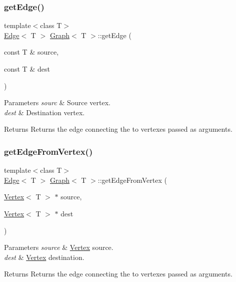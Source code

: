\subsubsection{\texorpdfstring{get\+Edge()}{getEdge()}}
{\footnotesize\ttfamily template$<$class T$>$ \\
\hyperlink{class_edge}{Edge}$<$ T $>$ \hyperlink{class_graph}{Graph}$<$ T $>$\+::get\+Edge (\begin{DoxyParamCaption}\item[{const T \&}]{source,  }\item[{const T \&}]{dest }\end{DoxyParamCaption})}


\begin{DoxyParams}{Parameters}
{\em sourc} & Source vertex. \\
\hline
{\em dest} & Destination vertex. \\
\hline
\end{DoxyParams}
\begin{DoxyReturn}{Returns}
Returns the edge connecting the to vertexes passed as arguments. 
\end{DoxyReturn}
\mbox{\label{class_graph_a05fe0254b4f8ac9d3af0fb47561212d8}} 
\subsubsection{\texorpdfstring{get\+Edge\+From\+Vertex()}{getEdgeFromVertex()}}
{\footnotesize\ttfamily template$<$class T$>$ \\
\hyperlink{class_edge}{Edge}$<$ T $>$ \hyperlink{class_graph}{Graph}$<$ T $>$\+::get\+Edge\+From\+Vertex (\begin{DoxyParamCaption}\item[{\hyperlink{class_vertex}{Vertex}$<$ T $>$ $\ast$}]{source,  }\item[{\hyperlink{class_vertex}{Vertex}$<$ T $>$ $\ast$}]{dest }\end{DoxyParamCaption})}


\begin{DoxyParams}{Parameters}
{\em source} & \hyperlink{class_vertex}{Vertex} source. \\
\hline
{\em dest} & \hyperlink{class_vertex}{Vertex} destination.\\
\hline
\end{DoxyParams}
\begin{DoxyReturn}{Returns}
Returns the edge connecting the to vertexes passed as arguments. 
\end{DoxyReturn}
\mbox{\label{class_graph_a4381ffcd7b26938461c08561fa8bec6c}} 

